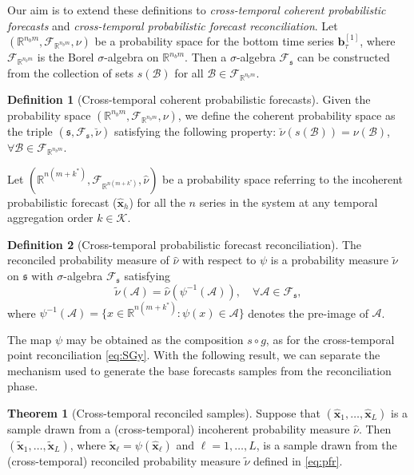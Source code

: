 \documentclass[12pt]{article}
\newcommand{\bvet}{\bm{b}}
\newcommand{\xvet}{\bm{x}}
\theoremstyle{definition}
\newtheorem{definition}{Definition}[section]
\newtheorem{theorem}{Theorem}[section]
\begin{document}
Our aim is to extend these definitions to \textit{cross-temporal coherent probabilistic forecasts} and \textit{cross-temporal probabilistic forecast reconciliation}. Let $(\mathbb{R}^{n_b m}, \mathcal{F}_{\mathbb{R}^{n_b m}}, \nu)$ be a probability space for the bottom time series $\bvet_{\tau}^{[1]}$, where $\mathcal{F}_{\mathbb{R}^{n_b m}}$ is the Borel $\sigma$-algebra on $\mathbb{R}^{n_b m}$. Then a $\sigma$-algebra $\mathcal{F}_{\mathfrak{s}}$ can be constructed from the collection of sets $s(\mathcal{B})$ for all $\mathcal{B} \in \mathcal{F}_{\mathbb{R}^{n_b m}}$.
\begin{definition}[Cross-temporal coherent probabilistic forecasts]
	Given the probability space $(\mathbb{R}^{n_b m}, \mathcal{F}_{\mathbb{R}^{n_b m}}, \nu)$, we define the coherent probability space as the triple $(\mathfrak{s}, \mathcal{F}_{\mathfrak{s}}, \breve{\nu})$ satisfying the following property:
	$\breve{\nu}(s(\mathcal{B}))=\nu(\mathcal{B})$, $\forall \mathcal{B} \in \mathcal{F}_{\mathbb{R}^{n_b m}}$.
\end{definition}
Let $(\mathbb{R}^{n(m+k^\ast)}, \mathcal{F}_{\mathbb{R}^{n(m+k^\ast)}}, \hat{\nu})$ be a probability space referring to the incoherent probabilistic forecast ($\widehat{\xvet}_{h}$) for all the $n$ series in the system at any temporal aggregation order $k \in \mathcal{K}$.
\begin{definition}[Cross-temporal probabilistic forecast reconciliation]\label{def:pfr}
	The reconciled probability measure of $\hat{\nu}$ with respect to $\psi$ is a probability measure $\tilde{\nu}$ on $\mathfrak{s}$ with $\sigma$-algebra $\mathcal{F}_{\mathfrak{s}}$ satisfying
	\begin{equation}\label{eq:pfr}
		\tilde{\nu}(\mathcal{A})=\hat{\nu}(\psi^{-1}(\mathcal{A})), \quad \forall \mathcal{A} \in \mathcal{F}_{\mathfrak{s}},
	\end{equation}
	where $\psi^{-1}(\mathcal{A})=\{x \in \mathbb{R}^{n(m+k^\ast)}: \psi(x) \in \mathcal{A}\}$ denotes the pre-image of $\mathcal{A}$.
\end{definition}
The map $\psi$ may be obtained as the composition $s \circ g$, as for the cross-temporal point reconciliation \eqref{eq:SGy}. With the following result, we can separate the mechanism used to generate the base forecasts samples from the reconciliation phase.
\begin{theorem}[Cross-temporal reconciled samples] \label{thm:rs}
	Suppose that $(\widehat{\xvet}_1, \dots, \widehat{\xvet}_L)$ is a sample drawn from a (cross-temporal) incoherent probability measure $\widehat{\nu}$. Then $(\widetilde{\xvet}_1, \dots, \widetilde{\xvet}_L)$, where $\widetilde{\xvet}_\ell=\psi(\widehat{\xvet}_\ell)$ and $\ell= 1, \dots, L$, is a sample drawn from the (cross-temporal) reconciled probability measure $\widetilde{\nu}$ defined in \eqref{eq:pfr}.
\end{theorem}
\end{document}
